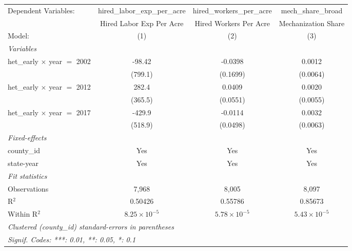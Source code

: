 
\begingroup
\centering
\begin{tabular}{lccc}
   \tabularnewline \midrule \midrule
   Dependent Variables:                & hired\_labor\_exp\_per\_acre     & hired\_workers\_per\_acre    & mech\_share\_broad\\    
                                       & Hired Labor Exp Per Acre         & Hired Workers Per Acre       & Mechanization Share \\   
   Model:                              & (1)                              & (2)                          & (3)\\  
   \midrule
   \emph{Variables}\\
   het\_early $\times$ year $=$ 2002   & -98.42                           & -0.0398                      & 0.0012\\   
                                       & (799.1)                          & (0.1699)                     & (0.0064)\\   
   het\_early $\times$ year $=$ 2012   & 282.4                            & 0.0409                       & 0.0020\\   
                                       & (365.5)                          & (0.0551)                     & (0.0055)\\   
   het\_early $\times$ year $=$ 2017   & -429.9                           & -0.0114                      & 0.0032\\   
                                       & (518.9)                          & (0.0498)                     & (0.0063)\\   
   \midrule
   \emph{Fixed-effects}\\
   county\_id                          & Yes                              & Yes                          & Yes\\  
   state-year                          & Yes                              & Yes                          & Yes\\  
   \midrule
   \emph{Fit statistics}\\
   Observations                        & 7,968                            & 8,005                        & 8,097\\  
   R$^2$                               & 0.50426                          & 0.55786                      & 0.85673\\  
   Within R$^2$                        & $8.25\times 10^{-5}$             & $5.78\times 10^{-5}$         & $5.43\times 10^{-5}$\\   
   \midrule \midrule
   \multicolumn{4}{l}{\emph{Clustered (county\_id) standard-errors in parentheses}}\\
   \multicolumn{4}{l}{\emph{Signif. Codes: ***: 0.01, **: 0.05, *: 0.1}}\\
\end{tabular}
\par\endgroup


